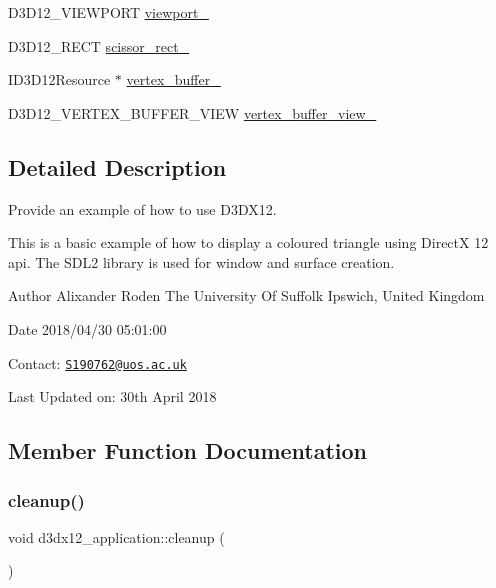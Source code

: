 \begin{DoxyCompactItemize}
\item 
D3\+D12\+\_\+\+V\+I\+E\+W\+P\+O\+RT \mbox{\hyperlink{classd3dx12__application_a3850b4dd8680e9cc85fac2919dde853a}{viewport\+\_\+}}
\item 
D3\+D12\+\_\+\+R\+E\+CT \mbox{\hyperlink{classd3dx12__application_acf5853fd413b7bdad1dd8e665cd47450}{scissor\+\_\+rect\+\_\+}}
\item 
I\+D3\+D12\+Resource $\ast$ \mbox{\hyperlink{classd3dx12__application_a8bbe015c0ae2ccf5aa1457d49c5b72d0}{vertex\+\_\+buffer\+\_\+}}
\item 
D3\+D12\+\_\+\+V\+E\+R\+T\+E\+X\+\_\+\+B\+U\+F\+F\+E\+R\+\_\+\+V\+I\+EW \mbox{\hyperlink{classd3dx12__application_ac793221410fe3f40002313055c8b1226}{vertex\+\_\+buffer\+\_\+view\+\_\+}}
\end{DoxyCompactItemize}


\subsection{Detailed Description}
Provide an example of how to use D3\+D\+X12. 

This is a basic example of how to display a coloured triangle using DirectX 12 api. The S\+D\+L2 library is used for window and surface creation.

\begin{DoxyAuthor}{Author}
Alixander Roden The University Of Suffolk Ipswich, United Kingdom
\end{DoxyAuthor}
\begin{DoxyDate}{Date}
2018/04/30 05\+:01\+:00
\end{DoxyDate}
Contact\+: \href{mailto:S190762@uos.ac.uk}{\tt S190762@uos.\+ac.\+uk}

Last Updated on\+: 30th April 2018 

\subsection{Member Function Documentation}
\mbox{\label{classd3dx12__application_a47fa5a8d1975c52b9b9531e602b8da6a}} 
\subsubsection{\texorpdfstring{cleanup()}{cleanup()}}
{\footnotesize\ttfamily void d3dx12\+\_\+application\+::cleanup (\begin{DoxyParamCaption}{ }\end{DoxyParamCaption})\hspace{0.3cm}{\ttfamily [private]}}

